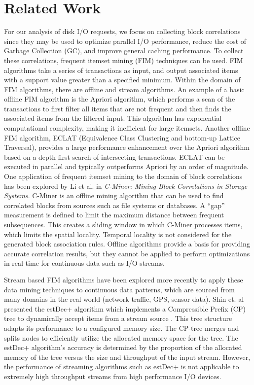 \documentclass[MEng]{uofl}
\begin{document}
\chapter{Related Work}
For our analysis of disk I/O requests, we focus on collecting block correlations since they may be used to optimize parallel I/O performance, reduce the cost of Garbage Collection (GC), and improve general caching performance. To collect these correlations, frequent itemset mining (FIM) techniques can be used\cite{Li}. FIM algorithms take a series of transactions as input, and output associated items with a support value greater than a specified minimum.  Within the domain of FIM algorithms, there are offline and stream algorithms. An example of a basic offline FIM algorithm is the Apriori algorithm, which performs a scan of the transactions to first filter all items that are not frequent and then finds the associated items from the filtered input\cite{borge}. This algorithm has exponential computational complexity, making it inefficient for large itemsets. Another offline FIM algorithm, ECLAT (Equivalence Class Clustering and bottom-up Lattice Traversal), provides a large performance enhancement over the Apriori algorithm based on a depth-first search of intersecting transactions\cite{borge}. ECLAT can be executed in parallel and typically outperforms Apriori by an order of magnitude. One application of frequent itemset mining to the domain of block correlations has been explored by Li et al. in \textit{C-Miner: Mining Block Correlations in Storage Systems}\cite{Li}. C-Miner is an offline mining algorithm that can be used to find correlated blocks from sources such as file systems or databases. A “gap” measurement is defined to limit the maximum distance between frequent subsequences. This creates a sliding window in which C-Miner processes items, which limits the spatial locality. Temporal locality is not considered for the generated block association rules. Offline algorithms provide a basis for providing accurate correlation results, but they cannot be applied to perform optimizations in real-time for continuous data such as I/O streams.

Stream based FIM algorithms have been explored more recently to apply these data mining techniques to continuous data patterns, which are sourced from many domains in the real world (network traffic, GPS, sensor data). Shin et. al presented the estDec+ algorithm which implements a Compressible Prefix (CP) tree to dynamically accept items from a stream source \cite{Shin}. This tree structure adapts its performance to a configured memory size. The CP-tree merges and splits nodes to efficiently utilize the allocated memory space for the tree. The estDec+ algorithm’s accuracy is determined by the proportion of the allocated memory of the tree versus the size and throughput of the input stream.  However, the performance of streaming algorithms such as estDec+ is not applicable to extremely high throughput streams from high performance I/O devices. 
\end{document}
